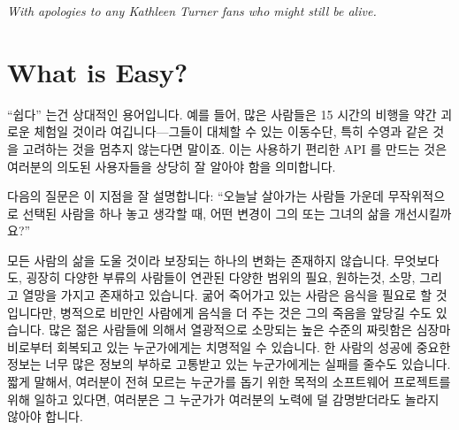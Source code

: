 
%
	 {\emph{With apologies to any Kathleen Turner fans who might
	  still be alive.}}

\section{What is Easy?}
\label{sec:easy:What is Easy?}

``쉽다'' 는건 상대적인 용어입니다.
예를 들어, 많은 사람들은 15 시간의 비행을 약간 괴로운 체험일 것이라
여깁니다---그들이 대체할 수 있는 이동수단, 특히 수영과 같은 것을 고려하는 것을
멈추지 않는다면 말이죠.
이는 사용하기 편리한 API 를 만드는 것은 여러분의 의도된 사용자들을 상당히 잘
알아야 함을 의미합니다.

다음의 질문은 이 지점을 잘 설명합니다: ``오늘날 살아가는 사람들 가운데
무작위적으로 선택된 사람을 하나 놓고 생각할 때, 어떤 변경이 그의 또는 그녀의
삶을 개선시킬까요?''

모든 사람의 삶을 도울 것이라 보장되는 하나의 변화는 존재하지 않습니다.
무엇보다도, 굉장히 다양한 부류의 사람들이 연관된 다양한 범위의 필요, 원하는것,
소망, 그리고 열망을 가지고 존재하고 있습니다.
굶어 죽어가고 있는 사람은 음식을 필요로 할 것입니다만, 병적으로 비만인 사람에게
음식을 더 주는 것은 그의 죽음을 앞당길 수도 있습니다.
많은 젊은 사람들에 의해서 열광적으로 소망되는 높은 수준의 짜릿함은
심장마비로부터 회복되고 있는 누군가에게는 치명적일 수 있습니다.
한 사람의 성공에 중요한 정보는 너무 많은 정보의 부하로 고통받고 있는
누군가에게는 실패를 줄수도 있습니다.
짧게 말해서, 여러분이 전혀 모르는 누군가를 돕기 위한 목적의 소프트웨어
프로젝트를 위해 일하고 있다면, 여러분은 그 누군가가 여러분의 노력에 덜
감명받더라도 놀라지 않아야 합니다.
\iffalse

